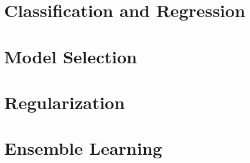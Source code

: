 \section{Classification and Regression}


\section{Model Selection}


\section{Regularization}


\section{Ensemble Learning}

